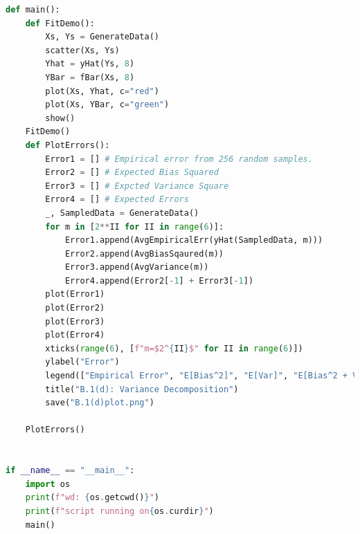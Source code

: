 \documentclass[]{article}
\begin{document}
\begin{lstlisting}[language=python]
def main():
    def FitDemo():
        Xs, Ys = GenerateData()
        scatter(Xs, Ys)
        Yhat = yHat(Ys, 8)
        YBar = fBar(Xs, 8)
        plot(Xs, Yhat, c="red")
        plot(Xs, YBar, c="green")
        show()
    FitDemo()
    def PlotErrors():
        Error1 = [] # Empirical error from 256 random samples.
        Error2 = [] # Expected Bias Squared
        Error3 = [] # Expcted Variance Square
        Error4 = [] # Expected Errors
        _, SampledData = GenerateData()
        for m in [2**II for II in range(6)]:
            Error1.append(AvgEmpiricalErr(yHat(SampledData, m)))
            Error2.append(AvgBiasSqaured(m))
            Error3.append(AvgVariance(m))
            Error4.append(Error2[-1] + Error3[-1])
        plot(Error1)
        plot(Error2)
        plot(Error3)
        plot(Error4)
        xticks(range(6), [f"m=$2^{II}$" for II in range(6)])
        ylabel("Error")
        legend(["Empirical Error", "E[Bias^2]", "E[Var]", "E[Bias^2 + Var]"])
        title("B.1(d): Variance Decomposition")
        save("B.1(d)plot.png")

    PlotErrors()


if __name__ == "__main__":
    import os
    print(f"wd: {os.getcwd()}")
    print(f"script running on{os.curdir}")
    main()
        \end{lstlisting}
\end{document}
